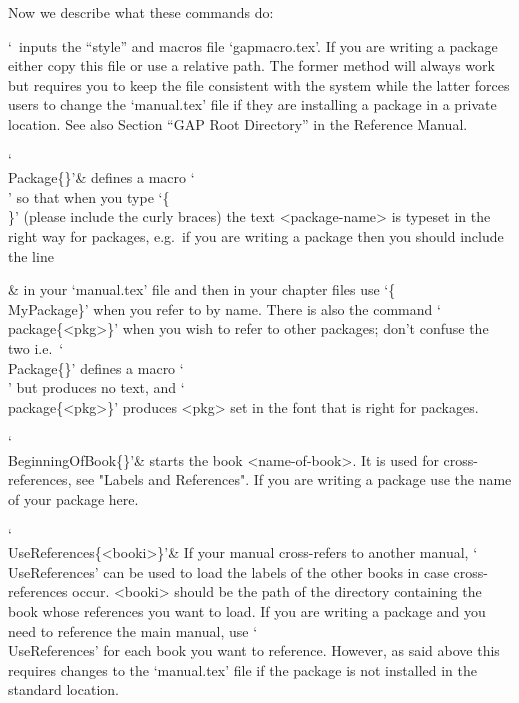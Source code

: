 Now we describe what these commands do:

\beginitems

`\
inputs the {\GAP} ``style'' and macros file `gapmacro.tex'.  If  you  are
writing a {\GAP} package either copy this file or use  a  relative  path.
The former method will always work but requires  you  to  keep  the  file
consistent with the system while the latter forces users  to  change  the
`manual.tex' file if they are installing a package in a private location.
See also Section ``GAP Root Directory'' in the {\GAP} Reference Manual.

\indextt{\\Package}
`\\Package\{<package-name>\}'&
defines   a   macro   `\\<package-name>'   so   that   when   you    type
`\{\\<package-name>\}'  (please  include  the  curly  braces)  the   text
<package-name> is typeset in the right way for {\GAP}  packages,  e.g.~if
you are writing a package \package{MyPackage} then you should include the
line


  &
in  your  `manual.tex'  file  and  then  in  your   chapter   files   use
`\{\\MyPackage\}' when you refer to \package{MyPackage} by name. There is
also the command `\\package\{<pkg>\}' when you wish  to  refer  to  other
{\GAP} packages; don't confuse the two i.e.~`\\Package\{<package-name>\}'
defines  a  macro  `\\<package-name>'   but   produces   no   text,   and
`\\package\{<pkg>\}' produces <pkg> set in the font  that  is  right  for
{\GAP} packages.

\indextt{\\BeginningOfBook}
`\\BeginningOfBook\{<name-of-book>\}'&
starts the book <name-of-book>. It  is  used  for  cross-references,  see
"Labels and References". If you are writing a {\GAP} package use the name
of your package here.

\indextt{\\UseReferences}\indextt{\\UseGapDocReferences}
`\\UseReferences\{<booki>\}'&
If your manual cross-refers to another manual, `\\UseReferences'  can  be
used to load the labels of  the  other  books  in  case  cross-references
occur. <booki> should be the path of the directory  containing  the  book
whose references you want to load. If you are writing  a  {\GAP}  package
and you need to reference the main {\GAP} manual,  use  `\\UseReferences'
for each book you want to reference. However, as said above this requires
changes to the `manual.tex' file if the package is not installed  in  the
standard location.

